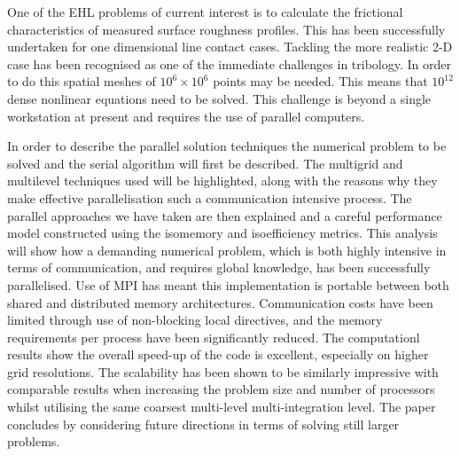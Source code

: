 \documentclass{report}
\begin{document}
One  of the EHL problems of current interest is to calculate the
frictional characteristics of measured surface roughness profiles.
This has been successfully undertaken for one dimensional line contact
cases.  Tackling the more realistic 2-D case has been recognised as one
of the immediate challenges in tribology. In order to do this spatial
meshes of $10^6 \times 10^6$ points may be needed. This means that
$10^{12}$ dense nonlinear equations need to be solved. This challenge
is beyond a single workstation at present and requires the use of
parallel computers.

In order to describe the parallel solution techniques the numerical
problem to be solved and the serial algorithm will first be described.
The multigrid and multilevel techniques used will be highlighted, along
with the reasons why they make effective parallelisation such a
communication intensive process.  The parallel approaches we have taken
are then explained and a careful performance model constructed using
the isomemory and isoefficiency metrics.  This analysis  will show how
a demanding numerical problem, which is both highly intensive in terms
of communication, and requires global knowledge, has been successfully
parallelised.  Use of MPI has meant this implementation is portable
between both shared and distributed memory architectures.
Communication costs have been limited through use of non-blocking local
directives, and the memory requirements per process have been
significantly reduced.  The computationl results show the overall
speed-up of the code is excellent, especially on higher grid
resolutions.  The scalability has been shown to be similarly impressive
with comparable results when increasing the problem size and number of
processors whilst utilising the same coarsest multi-level
multi-integration level.  The paper concludes by considering future
directions in terms of solving still larger problems.
\end{document}
